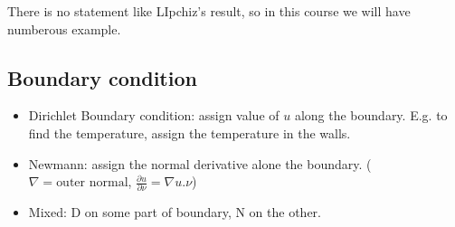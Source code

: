 \documentclass[a4paper]{article}
\theoremstyle{definition}
\begin{document}
	There is no statement like LIpchiz's result, so in this course we will have numberous example. 
\subsection{Boundary condition}%
\label{sub:djflka}
\begin{itemize}
	\item Dirichlet Boundary condition: assign value of $u$ along the boundary. E.g. to find the temperature, assign the temperature in the walls. 
	\item Newmann: assign the normal derivative alone the boundary. ($\nabla =\text{outer normal}$, $\frac{\partial u}{\partial \nu} =\nabla u . \nu$)
	\item Mixed: D on some part of boundary, N on the other. 	
\end{itemize}	
\end{document}
